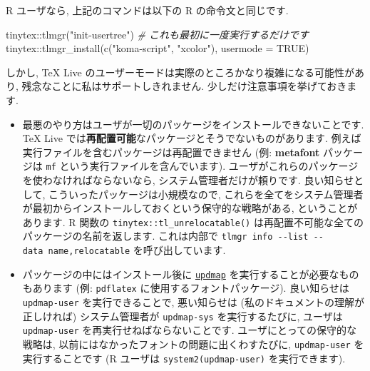 \documentclass[
  xelatex,ja=standard,jafont=noto]{bxjsreport}
\newenvironment{Shaded}{\begin{snugshade}}{\end{snugshade}}
\newcommand{\AttributeTok}[1]{\textcolor[rgb]{0.77,0.63,0.00}{#1}}
\newcommand{\CommentTok}[1]{\textcolor[rgb]{0.56,0.35,0.01}{\textit{#1}}}
\newcommand{\ConstantTok}[1]{\textcolor[rgb]{0.00,0.00,0.00}{#1}}
\newcommand{\FunctionTok}[1]{\textcolor[rgb]{0.00,0.00,0.00}{#1}}
\newcommand{\NormalTok}[1]{#1}
\newcommand{\SpecialCharTok}[1]{\textcolor[rgb]{0.00,0.00,0.00}{#1}}
\newcommand{\StringTok}[1]{\textcolor[rgb]{0.31,0.60,0.02}{#1}}
\begin{document}
R ユーザなら, 上記のコマンドは以下の R の命令文と同じです.

\begin{Shaded}
\begin{Highlighting}[numbers=left,,]
\NormalTok{tinytex}\SpecialCharTok{::}\FunctionTok{tlmgr}\NormalTok{(}\StringTok{"init{-}usertree"}\NormalTok{) }\CommentTok{\# これも最初に一度実行するだけです}
\NormalTok{tinytex}\SpecialCharTok{::}\FunctionTok{tlmgr\_install}\NormalTok{(}\FunctionTok{c}\NormalTok{(}\StringTok{"koma{-}script"}\NormalTok{, }\StringTok{"xcolor"}\NormalTok{), }\AttributeTok{usermode =} \ConstantTok{TRUE}\NormalTok{)}
\end{Highlighting}
\end{Shaded}

しかし, TeX Live
のユーザーモードは実際のところかなり複雑になる可能性があり,
残念なことに私はサポートしきれません. 少しだけ注意事項を挙げておきます.

\begin{itemize}
\item
  最悪のやり方はユーザが一切のパッケージをインストールできないことです.
  TeX Live
  では\textbf{再配置可能}なパッケージとそうでないものがあります.
  例えば実行ファイルを含むパッケージは再配置できません (例:
  \textbf{metafont} パッケージは \texttt{mf}
  という実行ファイルを含んでいます).
  ユーザがこれらのパッケージを使わなければならないなら,
  システム管理者だけが頼りです. 良い知らせとして,
  こういったパッケージは小規模なので,
  これらを全てをシステム管理者が最初からインストールしておくという保守的な戦略がある,
  ということがあります. R 関数の \texttt{tinytex::tl\_unrelocatable()}
  は再配置不可能な全てのパッケージの名前を返します. これは内部で
  \texttt{tlmgr\ info\ -\/-list\ -\/-data\ name,relocatable}
  を呼び出しています.
\item
  パッケージの中にはインストール後に
  \href{https://www.tug.org/texlive/doc/updmap.html}{\texttt{updmap}}
  を実行することが必要なものもあります (例: \texttt{pdflatex}
  に使用するフォントパッケージ). 良い知らせは \texttt{updmap-user}
  を実行できることで, 悪い知らせは (私のドキュメントの理解が正しければ)
  システム管理者が \texttt{updmap-sys} を実行するたびに, ユーザは
  \texttt{updmap-user} を再実行せねばならないことです.
  ユーザにとっての保守的な戦略は,
  以前にはなかったフォントの問題に出くわすたびに, \texttt{updmap-user}
  を実行することです (R ユーザは
  \texttt{system2(\textquotesingle{}updmap-user\textquotesingle{})}
  を実行できます).
\end{itemize}
\end{document}
